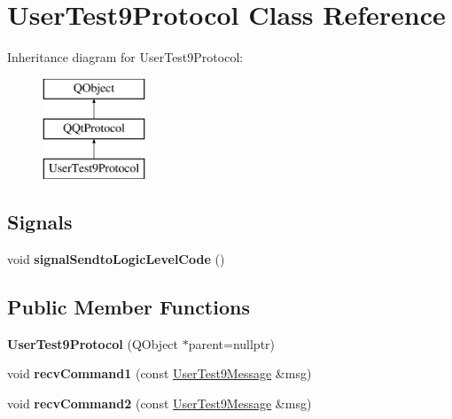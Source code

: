 \hypertarget{class_user_test9_protocol}{}\section{User\+Test9\+Protocol Class Reference}
\label{class_user_test9_protocol}
Inheritance diagram for User\+Test9\+Protocol\+:\begin{figure}[H]
\begin{center}
\leavevmode
\includegraphics[height=3.000000cm]{class_user_test9_protocol}
\end{center}
\end{figure}
\subsection*{Signals}
\begin{DoxyCompactItemize}
\item 
\mbox{\label{class_user_test9_protocol_a9cbbc865019947046bcba6ca8d5d70a9}} 
void {\bfseries signal\+Sendto\+Logic\+Level\+Code} ()
\end{DoxyCompactItemize}
\subsection*{Public Member Functions}
\begin{DoxyCompactItemize}
\item 
\mbox{\label{class_user_test9_protocol_a5fcad401f8e446689fd270630e40e79d}} 
{\bfseries User\+Test9\+Protocol} (Q\+Object $\ast$parent=nullptr)
\item 
\mbox{\label{class_user_test9_protocol_a1559666b02d63f41e5e378d022f4fd0e}} 
void {\bfseries recv\+Command1} (const \mbox{\hyperlink{class_user_test9_message}{User\+Test9\+Message}} \&msg)
\item 
\mbox{\label{class_user_test9_protocol_a4db977d4da4bc21f1d5e36cd2929e822}} 
void {\bfseries recv\+Command2} (const \mbox{\hyperlink{class_user_test9_message}{User\+Test9\+Message}} \&msg)
\end{DoxyCompactItemize}
